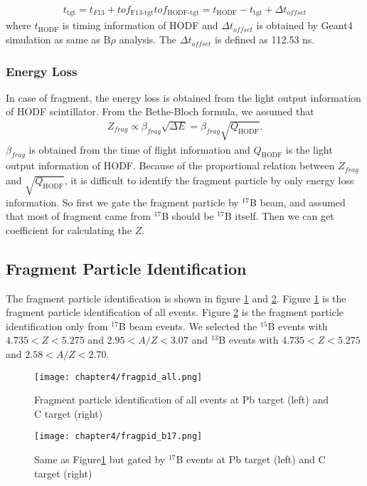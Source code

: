 \begin{align}
    t_{\text{tgt}} = t_{F13} + tof_{\text{F13-tgt}}
    tof_{\text{HODF-tgt}} = t_{\text{HODF}} - t_{\text{tgt}} + \Delta t_{offset}
\end{align}
where $t_{\text{HODF}}$ is timing information of HODF and $\Delta t_{offset}$ is obtained by Geant4 simulation as same as B$\rho$ analysis. The $\Delta t_{offset}$ is defined as 112.53 ns.

\subsubsection{Energy Loss}
In case of fragment, the energy loss is obtained from the light output information of HODF scintillator. From the Bethe-Bloch formula, we assumed that 
\begin{align}
    Z_{frag} \propto \beta_{frag} \sqrt{\Delta E} = \beta_{frag} \sqrt{Q_{\text{HODF}}}.
\end{align}
$\beta_{frag}$ is obtained from the time of flight information and $Q_{\text{HODF}}$ is the light output information of HODF. Because of the proportional relation between $Z_{frag}$ and $\sqrt{Q_{\text{HODF}}}$, it is difficult to identify the fragment particle by only energy loss information. So first we gate the fragment particle by ${}^{17}$B beam, and assumed that most of fragment came from ${}^{17}$B should be ${}^{17}$B itself. Then we can get coefficient for calculating the $Z$.

\subsection{Fragment Particle Identification}
The fragment particle identification is shown in figure \ref{fig:fragpid_all} and \ref{fig:fragpid_b17}. Figure \ref{fig:fragpid_all} is the fragment particle identification of all events. Figure \ref{fig:fragpid_b17} is the fragment particle identification only from ${}^{17}$B beam events. We selected the $^{15}$B events with $4.735 < Z < 5.275$ and $2.95 < A/Z < 3.07$ and $^{13}$B events with $4.735 < Z < 5.275$ and $2.58 < A/Z < 2.70$.
\begin{figure}
    \centering
    \texttt{[image: chapter4/fragpid\_all.png]}
    \caption[Fragment particle identification]{Fragment particle identification of all events at Pb target (left) and C target (right)}
    \label{fig:fragpid_all}
\end{figure}

\begin{figure}
    \centering
    \texttt{[image: chapter4/fragpid\_b17.png]}
    \caption[Fragment particle identification from ${}^{17}$B beam]{Same as Figure\ref{fig:fragpid_all} but gated by ${}^{17}$B events at Pb target (left) and C target (right)}
    \label{fig:fragpid_b17}
\end{figure}


